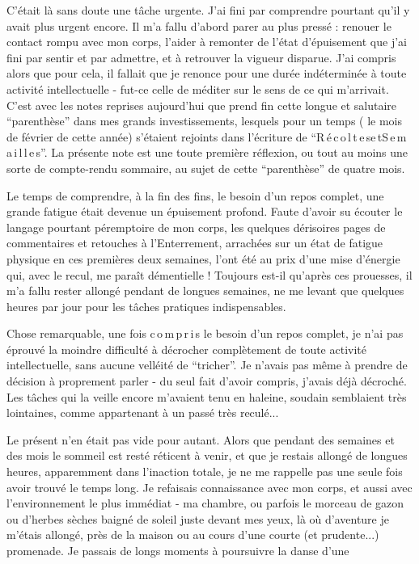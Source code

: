 C'était là sans doute une tâche urgente. J'ai fini par comprendre pourtant qu'il y avait plus urgent encore. Il m'a fallu d'abord parer au plus pressé : renouer le contact rompu avec mon corps, l'aider à remonter de l'état d'épuisement que j'ai fini par sentir et par admettre, et à retrouver la vigueur disparue. J'ai compris alors que pour cela, il fallait que je renonce pour une durée indéterminée à toute activité intellectuelle - fut-ce celle de méditer sur le sens de ce qui m'arrivait. C'est avec les notes reprises aujourd'hui que prend fin cette longue et salutaire ``parenthèse'' dans mes grands investissements, lesquels pour un temps ( le mois de février de cette année) s'étaient rejoints dans l'écriture de ``R\,é\,c\,o\,l\,t\,e\,s\quad e\,t\quad S\,e\,m\,a\,i\,l\,l\,e\,s''. La présente note est une toute première réflexion, ou tout au moins une sorte de compte-rendu sommaire, au sujet de cette ``parenthèse'' de quatre mois.

Le temps de comprendre, à la fin des fins, le besoin d'un repos complet, une grande fatigue était devenue un épuisement profond. Faute d'avoir su écouter le langage pourtant péremptoire de mon corps, les quelques dérisoires pages de commentaires et retouches à l'Enterrement, arrachées sur un état de fatigue physique en ces premières deux semaines, l'ont été au prix d'une mise d'énergie qui, avec le recul, me paraît démentielle ! Toujours est-il qu'après ces prouesses, il m'a fallu rester allongé pendant de longues semaines, ne me levant que quelques heures par jour pour les tâches pratiques indispensables.

Chose remarquable, une fois c\,o\,m\,p\,r\,i\,s le besoin d'un repos complet, je n'ai pas éprouvé la moindre difficulté à décrocher complètement de toute activité intellectuelle, sans aucune velléité de ``tricher''. Je n'avais pas même à prendre de décision à proprement parler - du seul fait d'avoir compris, j'avais déjà décroché. Les tâches qui la veille encore m'avaient tenu en haleine, soudain semblaient très lointaines, comme appartenant à un passé très reculé...

Le présent n'en était pas vide pour autant. Alors que pendant des semaines et des mois le sommeil est resté réticent à venir, et que je restais allongé de longues heures, apparemment dans l'inaction totale, je ne me rappelle pas une seule fois avoir trouvé le temps long. Je refaisais connaissance avec mon corps, et aussi avec l'environnement le plus immédiat - ma chambre, ou parfois le morceau de gazon ou d'herbes sèches baigné de soleil juste devant mes yeux, là où d'aventure je m'étais allongé, près de la maison ou au cours d'une courte (et prudente...) promenade. Je passais de longs moments à poursuivre la danse d'une
